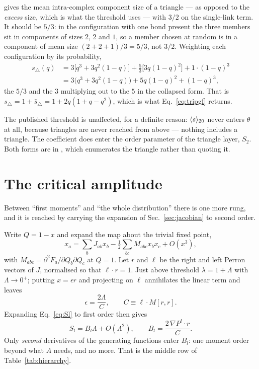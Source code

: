 \citet{vazquez2024comnet} gives the mean intra-complex component size
of a triangle --- as opposed to the \emph{excess} size, which is what the
threshold uses --- with $3/2$ on the single-link term. It should be $5/3$: in the configuration
with one bond present the three members sit in components of sizes $2$, $2$
and $1$, so a member chosen at random is in a component of mean size
$(2+2+1)/3=5/3$, not $3/2$. Weighting each configuration by its probability,
\begin{align*}
  s_{\triangle}(q)&=3\bigl[q^{3}+3q^{2}(1-q)\bigr]
    +\tfrac{5}{3}\bigl[3q(1-q)^{2}\bigr]+1\cdot(1-q)^{3}\\
  &=3\bigl(q^{3}+3q^{2}(1-q)\bigr)+5q(1-q)^{2}+(1-q)^{3},
\end{align*}
the $5/3$ and the $3$ multiplying out to the $5$ in the collapsed form. That
is $s_{\triangle}=1+\bar s_{\triangle}=1+2q(1+q-q^{2})$, which is what
Eq.~\eqref{eq:tripgf} returns.

The published threshold is unaffected, for a definite reason:
$\langle s \rangle_{20}$ never enters $\theta$ at all, because triangles are never reached
from above --- nothing includes a triangle. The coefficient does enter the order
parameter of the triangle layer, $S_{2}$. Both forms are in , which enumerates the triangle rather than quoting it.

\section{The critical amplitude}
\label{sec:amplitude}

Between ``first moments'' and ``the whole distribution'' there is one more rung,
and it is reached by carrying the expansion of Sec.~\ref{sec:jacobian} to second
order.

Write $Q=1-x$ and expand the map about the trivial fixed point,
\[
  x_{a}=\sum_{b}J_{ab}x_{b}-\tfrac12\sum_{bc}M_{abc}x_{b}x_{c}+O(x^{3}),
\]
with $M_{abc}=\partial^{2}F_{a}/\partial Q_{b}\partial Q_{c}$ at $Q=1$. Let $r$
and $\ell$ be the right and left Perron vectors of $J$, normalised so that
$\ell\cdot r=1$. Just above threshold $\lambda=1+\Lambda$ with
$\Lambda\to0^{+}$; putting $x=\epsilon r$ and projecting on $\ell$ annihilates
the linear term and leaves
\[
  \epsilon=\frac{2\Lambda}{C},\qquad C\equiv\ell\cdot M[r,r].
\]
Expanding Eq.~\eqref{eq:Sl} to first order then gives
\[
  S_{l}=B_{l}\Lambda+O(\Lambda^{2}),
  \qquad
  B_{l}=\frac{2\,\nabla P^{l}\cdot r}{C}.
\]
Only \emph{second} derivatives of the generating functions enter $B_{l}$: one
moment order beyond what $A$ needs, and no more. That is the middle row of
Table~\ref{tab:hierarchy}.

